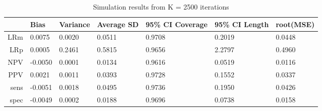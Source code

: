\begin{table}[ht]
\centering
\begin{tabular}{rllllll}
  \hline
 & Bias & Variance & Average SD & 95\% CI Coverage & 95\% CI Length & root(MSE) \\ 
  \hline
LRm & 0.0075 & 0.0020 & 0.0511 & 0.9708 & 0.2019 & 0.0448 \\ 
  LRp & 0.0005 & 0.2461 & 0.5815 & 0.9656 & 2.2797 & 0.4960 \\ 
  NPV & -0.0050 & 0.0001 & 0.0134 & 0.9616 & 0.0519 & 0.0116 \\ 
  PPV & 0.0021 & 0.0011 & 0.0393 & 0.9728 & 0.1552 & 0.0337 \\ 
  sens & -0.0051 & 0.0018 & 0.0495 & 0.9736 & 0.1950 & 0.0426 \\ 
  spec & -0.0049 & 0.0002 & 0.0188 & 0.9696 & 0.0738 & 0.0158 \\ 
   \hline
\end{tabular}
\caption{Simulation results from K = 2500 iterations} 
\end{table}
